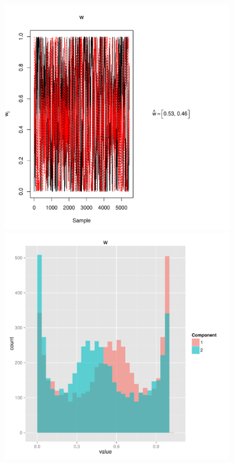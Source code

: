 \documentclass{article}
\begin{document}
\clearpage

\begin{figure}
	\begin{minipage}[h!]{0.49\textwidth}
		\centering
		\includegraphics[width=1.15\textwidth, height=4in]{wTrace2.pdf}
	\end{minipage}
	\begin{minipage}[h!]{0.49\textwidth}
		\centering
		\includegraphics[width=1\textwidth, height=4in]{wHist2.pdf}	
	\end{minipage}
\end{figure}

\clearpage
\end{document}
